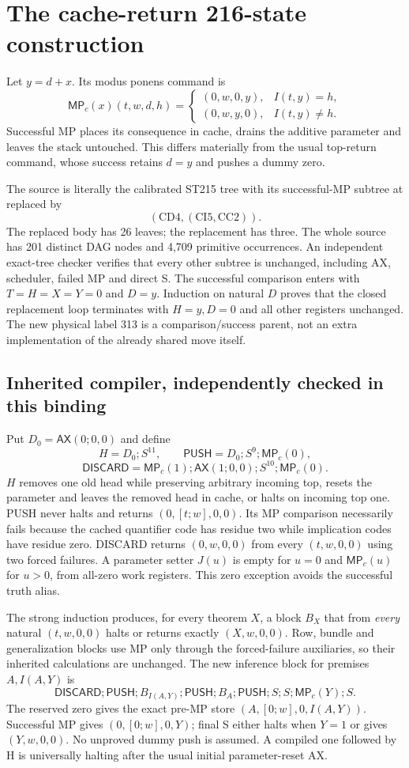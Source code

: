 \documentclass[11pt]{article}
\newcommand{\file}[1]{{\small\path{#1}}}
\newcommand{\MP}{\mathsf{MP}}
\newcommand{\AX}{\mathsf{AX}}
\newcommand{\PUSH}{\mathsf{PUSH}}
\newcommand{\DISCARD}{\mathsf{DISCARD}}
\begin{document}
\section{The cache-return 216-state construction}
Let $y=d+x$. Its modus ponens command is
\[
 \MP_c(x)(t,w,d,h)=
 \begin{cases}(0,w,0,y),&I(t,y)=h,\\(0,w,y,0),&I(t,y)\ne h.\end{cases}
\]
Successful MP places its consequence in cache, drains the additive parameter and leaves the stack untouched. This differs materially from the usual top-return command, whose success retains $d=y$ and pushes a dummy zero.

The source is literally the calibrated ST215 tree with its successful-MP subtree at \file{00110111} replaced by
\[
 (\mathrm{CD}4,(\mathrm{CI}5,\mathrm{CC}2)).
\]
The replaced body has 26 leaves; the replacement has three. The whole source has 201 distinct DAG nodes and 4,709 primitive occurrences. An independent exact-tree checker verifies that every other subtree is unchanged, including AX, scheduler, failed MP and direct S. The successful comparison enters with $T=H=X=Y=0$ and $D=y$. Induction on natural $D$ proves that the closed replacement loop terminates with $H=y,D=0$ and all other registers unchanged. The new physical label 313 is a comparison/success parent, not an extra implementation of the already shared move itself.

\subsection*{Inherited compiler, independently checked in this binding}
Put $D_0=\AX(0;0,0)$ and define
\[
 H=D_0;S^{11},\qquad \PUSH=D_0;S^9;\MP_c(0),
\]
\[
 \DISCARD=\MP_c(1);\AX(1;0,0);S^{10};\MP_c(0).
\]
$H$ removes one old head while preserving arbitrary incoming top, resets the parameter and leaves the removed head in cache, or halts on incoming top one. PUSH never halts and returns $(0,[t;w],0,0)$. Its MP comparison necessarily fails because the cached quantifier code has residue two while implication codes have residue zero. DISCARD returns $(0,w,0,0)$ from every $(t,w,0,0)$ using two forced failures. A parameter setter $J(u)$ is empty for $u=0$ and $\MP_c(u)$ for $u>0$, from all-zero work registers. This zero exception avoids the successful truth alias.

The strong induction produces, for every theorem $X$, a block $B_X$ that from \emph{every} natural $(t,w,0,0)$ halts or returns exactly $(X,w,0,0)$. Row, bundle and generalization blocks use MP only through the forced-failure auxiliaries, so their inherited calculations are unchanged. The new inference block for premises $A,I(A,Y)$ is
\[
 \DISCARD;\PUSH;B_{I(A,Y)};\PUSH;B_A;\PUSH;S;S;\MP_c(Y);S.
\]
The reserved zero gives the exact pre-MP store $(A,[0;w],0,I(A,Y))$. Successful MP gives $(0,[0;w],0,Y)$; final S either halts when $Y=1$ or gives $(Y,w,0,0)$. No unproved dummy push is assumed. A compiled one followed by H is universally halting after the usual initial parameter-reset AX.
\end{document}
